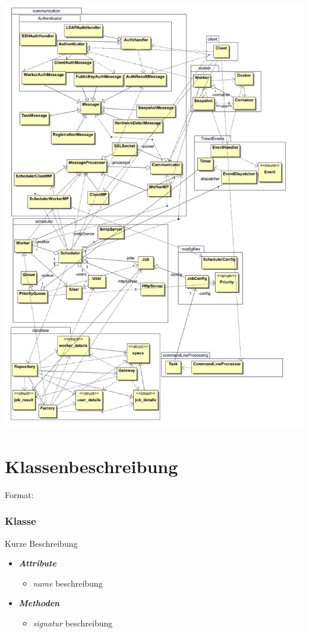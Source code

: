 \documentclass[a4paper,12pt]{article}
\begin{document}
\includegraphics[width=\textwidth]{miniclassoverview}

\section{Klassenbeschreibung}

\iffalse
Format:
\subsubsection{Klasse}

Kurze Beschreibung

\begin{itemize}[label={}]

	\item \textit{\textbf{Attribute}}
		\begin{itemize}[label={\textbullet}]
			\item \textit{name} beschreibung
		\end{itemize}

	\item \textit{\textbf{Methoden}}
		\begin{itemize}[label={\textbullet}]
			\item \textit{signatur} beschreibung
		\end{itemize}


\end{itemize}
\end{document}

